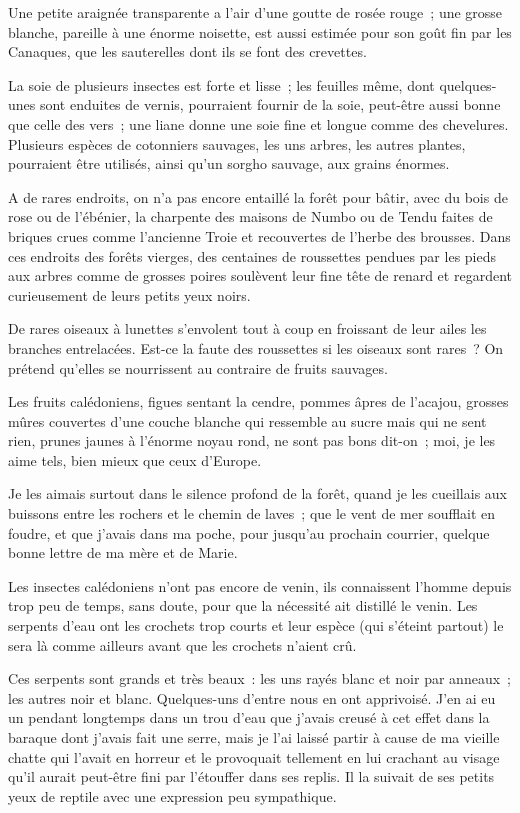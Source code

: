 \documentclass[french,twoside]{book} %
\begin{document}
Une petite araignée transparente a l’air d’une goutte de rosée rouge ; une grosse blanche, pareille  à une énorme noisette, est aussi estimée pour son goût fin par les Canaques, que les sauterelles dont ils se font des crevettes.\par
La soie de plusieurs insectes est forte et lisse ; les feuilles même, dont quelques-unes sont enduites de vernis, pourraient fournir de la soie, peut-être aussi bonne que celle des vers ; une liane donne une soie fine et longue comme des chevelures. Plusieurs espèces de cotonniers sauvages, les uns arbres, les autres plantes, pourraient être utilisés, ainsi qu’un sorgho sauvage, aux grains énormes.\par
A de rares endroits, on n’a pas encore entaillé la forêt pour bâtir, avec du bois de rose ou de l’ébénier, la charpente des maisons de Numbo ou de Tendu faites de briques crues comme l’ancienne Troie et recouvertes de l’herbe des brousses. Dans ces endroits des forêts vierges, des centaines de roussettes pendues par les pieds aux arbres comme de grosses poires soulèvent leur fine tête de renard et regardent curieusement de leurs petits yeux noirs.\par
De rares oiseaux à lunettes s’envolent tout à coup en froissant de leur ailes les branches entrelacées. Est-ce la faute des roussettes si les oiseaux sont rares ? On prétend qu’elles se nourrissent au contraire de fruits sauvages.\par
 Les fruits calédoniens, figues sentant la cendre, pommes âpres de l’acajou, grosses mûres couvertes d’une couche blanche qui ressemble au sucre mais qui ne sent rien, prunes jaunes à l’énorme noyau rond, ne sont pas bons dit-on ; moi, je les aime tels, bien mieux que ceux d’Europe.\par
Je les aimais surtout dans le silence profond de la forêt, quand je les cueillais aux buissons entre les rochers et le chemin de laves ; que le vent de mer soufflait en foudre, et que j’avais dans ma poche, pour jusqu’au prochain courrier, quelque bonne lettre de ma mère et de Marie.\par
Les insectes calédoniens n’ont pas encore de venin, ils connaissent l’homme depuis trop peu de temps, sans doute, pour que la nécessité ait distillé le venin. Les serpents d’eau ont les crochets trop courts et leur espèce (qui s’éteint partout) le sera là comme ailleurs avant que les crochets n’aient crû.\par
Ces serpents sont grands et très beaux : les uns rayés blanc et noir par anneaux ; les autres noir et blanc. Quelques-uns d’entre nous en ont apprivoisé. J’en ai eu un pendant longtemps dans un trou d’eau que j’avais creusé à cet effet dans la baraque dont j’avais fait une serre, mais je l’ai laissé partir à cause de ma vieille chatte qui  l’avait en horreur et le provoquait tellement en lui crachant au visage qu’il aurait peut-être fini par l’étouffer dans ses replis. Il la suivait de ses petits yeux de reptile avec une expression peu sympathique.\par
\end{document}
